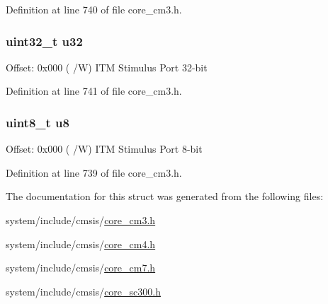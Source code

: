 Definition at line 740 of file core\+\_\+cm3.\+h.

\subsubsection[{\texorpdfstring{u32}{u32}}]{ uint32\+\_\+t u32}\hypertarget{struct_i_t_m___type_ae89dd50f788f12863c681fba1a5b60d1}{}\label{struct_i_t_m___type_ae89dd50f788f12863c681fba1a5b60d1}
Offset\+: 0x000 ( /W) I\+TM Stimulus Port 32-\/bit 

Definition at line 741 of file core\+\_\+cm3.\+h.

\subsubsection[{\texorpdfstring{u8}{u8}}]{ uint8\+\_\+t u8}\hypertarget{struct_i_t_m___type_a4c0550e859d614c607bd4b575f05425c}{}\label{struct_i_t_m___type_a4c0550e859d614c607bd4b575f05425c}
Offset\+: 0x000 ( /W) I\+TM Stimulus Port 8-\/bit 

Definition at line 739 of file core\+\_\+cm3.\+h.



The documentation for this struct was generated from the following files\+:\begin{DoxyCompactItemize}
\item 
system/include/cmsis/\hyperlink{core__cm3_8h}{core\+\_\+cm3.\+h}\item 
system/include/cmsis/\hyperlink{core__cm4_8h}{core\+\_\+cm4.\+h}\item 
system/include/cmsis/\hyperlink{core__cm7_8h}{core\+\_\+cm7.\+h}\item 
system/include/cmsis/\hyperlink{core__sc300_8h}{core\+\_\+sc300.\+h}\end{DoxyCompactItemize}
